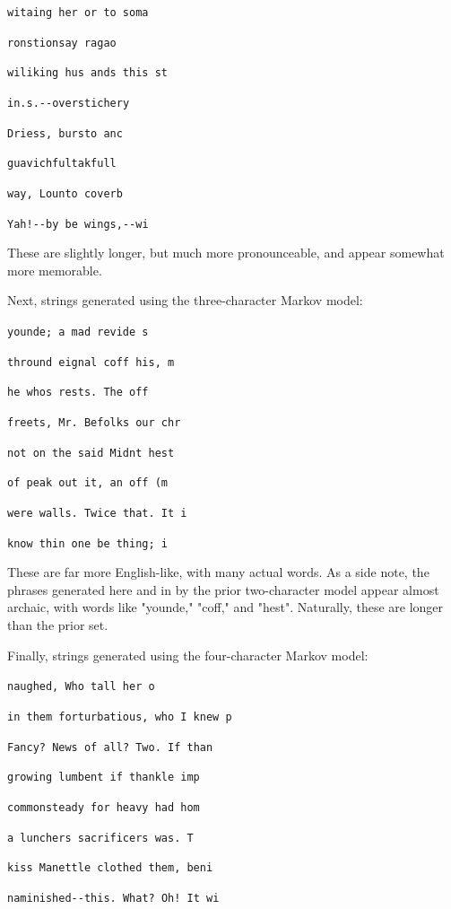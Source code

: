 \documentclass[preprint]{soups}
\newcommand{\Scribtexttt}[1]{{\texttt{#1}}}
\newenvironment{SingleColumn}{\begin{list}{}{\topsep=0pt\partopsep=0pt%
\listparindent=0pt\itemindent=0pt\labelwidth=0pt\leftmargin=0pt\rightmargin=0pt%
\itemsep=0pt\parsep=0pt}\item}{\end{list}}
\begin{document}
\begin{SingleColumn}\Scribtexttt{witaing her or to soma}

\Scribtexttt{ronstionsay ragao}

\Scribtexttt{wiliking hus ands this st}

\Scribtexttt{in{\hbox{\texttt{.}}}{\textquotesingle}s{\hbox{\texttt{.}}}{-}{-}overstichery}

\Scribtexttt{Driess, bursto anc}

\Scribtexttt{guavichfultakfull}

\Scribtexttt{way, Lounto coverb}

\Scribtexttt{Yah{\hbox{\texttt{!}}}{-}{-}by be wings,{-}{-}wi}\end{SingleColumn}

These are slightly longer, but much more pronounceable, and
appear somewhat more memorable.

Next, strings generated using the three{-}character Markov model:

\begin{SingleColumn}\Scribtexttt{younde; a mad revide s}

\Scribtexttt{thround eignal coff his, m}

\Scribtexttt{he who{\textquotesingle}s rests{\hbox{\texttt{.}}} The off}

\Scribtexttt{freets, Mr{\hbox{\texttt{.}}} Befolks our chr}

\Scribtexttt{not on the said Midn{\textquotesingle}t hest}

\Scribtexttt{of peak out it, an off (m}

\Scribtexttt{were walls{\hbox{\texttt{.}}} Twice that{\hbox{\texttt{.}}} It i}

\Scribtexttt{know thin one be thing; i}\end{SingleColumn}

These are far more English{-}like, with many actual words. As
a side note, the phrases generated here and in by the prior
two{-}character model appear almost archaic, with words like
"younde," "coff," and "hest". Naturally, these are longer
than the prior set.

Finally, strings generated using the four{-}character Markov model:

\begin{SingleColumn}\Scribtexttt{naughed, Who tall her o}

\Scribtexttt{in them forturbatious, who I knew p}

\Scribtexttt{Fancy{\hbox{\texttt{?}}} News of all{\hbox{\texttt{?}}} Two{\hbox{\texttt{.}}} If than}

\Scribtexttt{growing lumbent if thankle imp}

\Scribtexttt{commonsteady for heavy had hom}

\Scribtexttt{a luncher{\textquotesingle}s sacrificers was{\hbox{\texttt{.}}} T}

\Scribtexttt{kiss Manettle clothed them, beni}

\Scribtexttt{naminished{-}{-}this{\hbox{\texttt{.}}} What{\hbox{\texttt{?}}} Oh{\hbox{\texttt{!}}} It wi}\end{SingleColumn}
\end{document}

